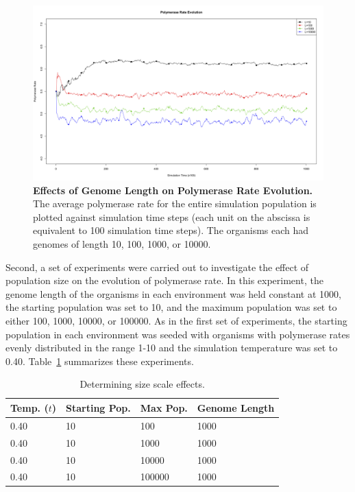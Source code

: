 \begin{figure}[h]
	\centering
		\includegraphics[width=\textwidth]{scale_length}
	\caption{\textbf{Effects of Genome Length on Polymerase Rate Evolution.} The average polymerase rate for the entire simulation population is plotted against simulation time steps (each unit on the abscissa is equivalent to 100 simulation time steps). The organisms each had genomes of length 10, 100, 1000, or 10000.}
	\label{fig:scale_length}
\end{figure}

Second, a set of experiments were carried out to investigate the effect of population size on the evolution of polymerase rate. In this experiment, the genome length of the organisms in each environment was held constant at 1000, the starting population was set to 10, and the maximum population was set to either 100, 1000, 10000, or 100000. As in the first set of experiments, the starting population in each environment was seeded with organisms with polymerase rates evenly distributed in the range 1-10 and the simulation temperature was set to 0.40. Table~\ref{tab:scale_num} summarizes these experiments.

\begin{table}
	\begin{center}
		\begin{tabular}[c]{ l | l | l | l }
			Temp. ($t$) & Starting Pop. & Max Pop. & Genome Length \\
			\hline
			0.40 & 10 & 100 & 1000 \\
			0.40 & 10 & 1000 & 1000 \\
			0.40 & 10 & 10000 & 1000 \\
			0.40 & 10 & 100000 & 1000 \\
		\end{tabular}
		\caption{Determining size scale effects.}
		\label{tab:scale_num}
	\end{center}
\end{table}


